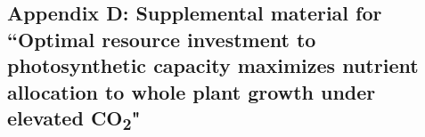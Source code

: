 \begin{singlespace}
    \chapter{\textbf{Appendix D: Supplemental material for ``Optimal resource investment to photosynthetic capacity maximizes nutrient allocation to whole plant growth under elevated CO\textsubscript{2}"}}
\end{singlespace}

\setcounter{table}{0}
\renewcommand{\thetable}{D\arabic{table}}
\setcounter{figure}{0}
\renewcommand{\thefigure}{D\arabic{figure}}

\begin{table}[!h]
    \caption[Summary table containing volumes of compounds used to create modified Hoagland’s solutions for each soil nitrogen fertilization treatment]{Summary table containing volumes of compounds used to create modified Hoagland’s solutions for each soil nitrogen fertilization treatment. All volumes are expressed as milliliters per liter (mL L$^{-1}$)}
    \label{table:tab.d1}
\end{table}
